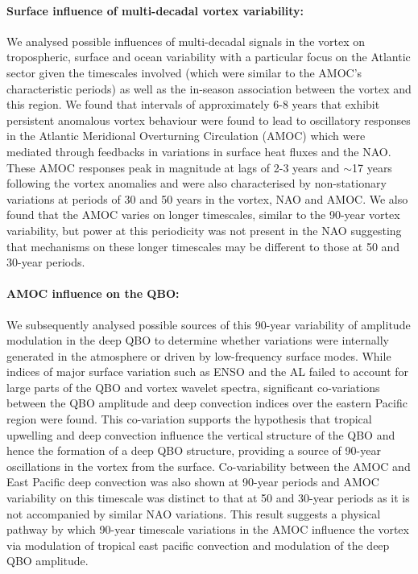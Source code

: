 \paragraph{Surface influence of multi-decadal vortex variability:}
We analysed possible influences of multi-decadal signals in the vortex on tropospheric, surface and ocean variability with a particular focus on the Atlantic sector given the timescales involved (which were similar to the AMOC's characteristic periods) as well as the in-season association between the vortex and this region. We found that intervals of approximately 6-8 years that exhibit persistent anomalous vortex behaviour were found to lead to oscillatory responses in the Atlantic Meridional Overturning Circulation (AMOC) which were mediated through feedbacks in variations in surface heat fluxes and the NAO. These AMOC responses peak in magnitude at lags of 2-3 years and $\sim$17 years following the vortex anomalies and were also characterised by non-stationary variations at periods of 30 and 50 years in the vortex, NAO and AMOC. We also found that the AMOC varies on longer timescales, similar to the 90-year vortex variability, but power at this periodicity was not present in the NAO suggesting that mechanisms on these longer timescales may be different to those at 50 and 30-year periods. 

\paragraph{AMOC influence on the QBO:}
We subsequently analysed possible sources of this 90-year variability of amplitude modulation in the deep QBO to determine whether variations were internally generated in the atmosphere or driven by low-frequency surface modes. While indices of major surface variation such as ENSO and the AL failed to account for large parts of the QBO and vortex wavelet spectra, significant co-variations between the QBO amplitude and deep convection indices over the eastern Pacific region were found. This co-variation supports the hypothesis that tropical upwelling and deep convection influence the vertical structure of the QBO and hence the formation of a deep QBO structure, providing a source of 90-year oscillations in the vortex from the surface. Co-variability between the AMOC and East Pacific deep convection was also shown at 90-year periods and AMOC variability on this timescale was distinct to that at 50 and 30-year periods as it is not accompanied by similar NAO variations. This result suggests a physical pathway by which 90-year timescale variations in the AMOC influence the vortex via modulation of tropical east pacific convection and modulation of the deep QBO amplitude. 

